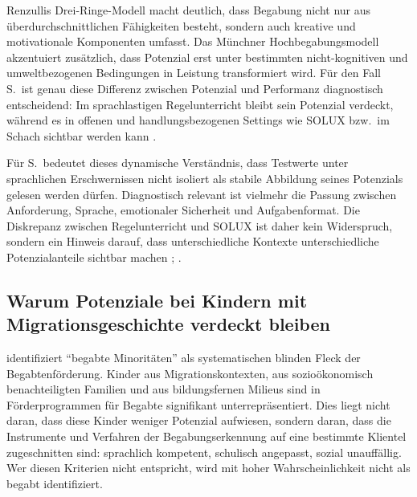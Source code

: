 \documentclass[ngerman, a4paper]{article}
\begin{document}
Renzullis Drei-Ringe-Modell macht deutlich, dass Begabung nicht nur
aus überdurchschnittlichen Fähigkeiten besteht, sondern auch kreative
und motivationale Komponenten umfasst. Das Münchner Hochbegabungsmodell
akzentuiert zusätzlich, dass Potenzial erst unter bestimmten
nicht-kognitiven und umweltbezogenen Bedingungen in Leistung
transformiert wird. Für den Fall S.\ ist genau diese Differenz zwischen
Potenzial und Performanz diagnostisch entscheidend: Im sprachlastigen
Regelunterricht bleibt sein Potenzial verdeckt, während es in offenen
und handlungsbezogenen Settings wie SOLUX bzw.\ im Schach sichtbar
werden kann \parencite[S.\,204--219]{muelleroppliger2021begabungsmodelle}.

Für S.\ bedeutet dieses dynamische Verständnis, dass Testwerte unter
sprachlichen Erschwernissen nicht isoliert als stabile Abbildung seines
Potenzials gelesen werden dürfen. Diagnostisch relevant ist vielmehr
die Passung zwischen Anforderung, Sprache, emotionaler Sicherheit und
Aufgabenformat. Die Diskrepanz zwischen Regelunterricht und SOLUX ist
daher kein Widerspruch, sondern ein Hinweis darauf, dass unterschiedliche
Kontexte unterschiedliche Potenzialanteile sichtbar machen
\parencite[S.\,204--219]{muelleroppliger2021begabungsmodelle};
\parencite[S.\,224--235]{muelleroppliger2021paeddiagnostik}.

\subsection{Warum Potenziale bei Kindern mit Migrationsgeschichte verdeckt bleiben}

\textcite[S.\,576--585]{stamm2021fehlenderblick} identifiziert
\enquote{begabte Minoritäten} als systematischen blinden Fleck der
Begabtenförderung. Kinder aus Migrationskontexten, aus sozioökonomisch benachteiligten
Familien und aus bildungsfernen Milieus sind in Förderprogrammen für Begabte signifikant
unterrepräsentiert. Dies liegt nicht daran, dass diese Kinder weniger Potenzial aufwiesen,
sondern daran, dass die Instrumente und Verfahren der Begabungserkennung auf eine
bestimmte Klientel zugeschnitten sind: sprachlich kompetent, schulisch angepasst,
sozial unauffällig. Wer diesen Kriterien nicht
entspricht, wird mit hoher Wahrscheinlichkeit nicht als begabt identifiziert.
\end{document}
